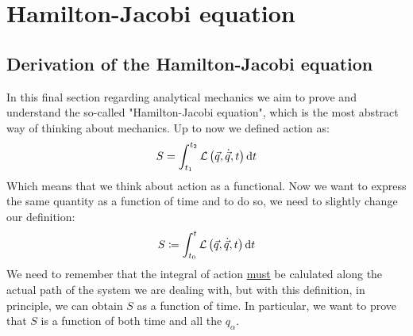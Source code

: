 \chapter{Hamilton-Jacobi equation}
\section{Derivation of the Hamilton-Jacobi equation}
In this final section regarding analytical mechanics we aim to prove and understand the so-called "Hamilton-Jacobi equation", which is the most abstract way of thinking about mechanics. Up to now we defined action as:
\begin{equation}
  S = \int_{t_1}^{t_2}\mathcal{L}\left(\vec{q},\dot{\vec{q}},t\right) \dd{t}
\end{equation}
Which means that we think about action as a functional. Now we want to express the same quantity as a function of time and to do so, we need to slightly change our definition:
\begin{equation}
  S \coloneqq \int_{t_0}^{t}\mathcal{L}\left(\vec{q},\dot{\vec{q}},t\right) \dd{t}
\end{equation}
We need to remember that the integral of action \underline{must} be calulated along the actual path of the system we are dealing with, but with this definition, in principle, we can obtain $S$ as a function of time. In particular, we want to prove that $S$ is a function of both time and all the $q_{\alpha}$.
